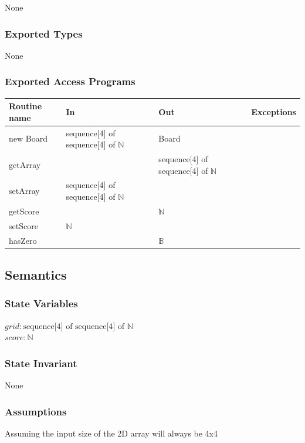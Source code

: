 \documentclass[12pt]{article}
\begin{document}
None

\subsubsection* {Exported Types}

None

\subsubsection* {Exported Access Programs}

\begin{tabular}{| l | l | l | p{5cm} |}
\hline
\textbf{Routine name} & \textbf{In} & \textbf{Out} & \textbf{Exceptions}\\
\hline
new Board & sequence[4] of sequence[4] of $\mathbb{N}$ & Board & \\
\hline
getArray & & sequence[4] of sequence[4] of $\mathbb{N}$ & ~\\
\hline
setArray & sequence[4] of sequence[4] of $\mathbb{N}$ & & ~\\
\hline
getScore & & $\mathbb{N}$ &~\\
\hline 
setScore & $\mathbb{N}$ & & ~\\
\hline
hasZero & & $\mathbb{B}$ &~\\
\hline
\end{tabular}

\subsection* {Semantics}

\subsubsection* {State Variables}

$\mathit{grid}: \text{sequence[4] of sequence[4] of } \mathbb{N}$\\
$\mathit{score}: \mathbb{N}$

\subsubsection* {State Invariant}

None

\subsubsection* {Assumptions}

Assuming the input size of the 2D array will always be 4x4
\end{document}
